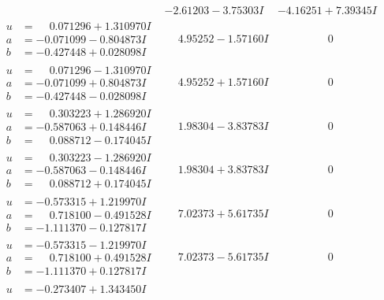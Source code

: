 \documentclass[1p]{elsarticle_modified}
\theoremstyle{definition}
\begin{document}
$$\begin{array}{c|c|c}
 & -2.61203 - 3.75303 I & -4.16251 + 7.39345 I \\ \hline\begin{aligned}
u &= \phantom{-}0.071296 + 1.310970 I \\
a &= -0.071099 - 0.804873 I \\
b &= -0.427448 + 0.028098 I\end{aligned}
 & \phantom{-}4.95252 - 1.57160 I & \phantom{-0.000000 } 0 \\ \hline\begin{aligned}
u &= \phantom{-}0.071296 - 1.310970 I \\
a &= -0.071099 + 0.804873 I \\
b &= -0.427448 - 0.028098 I\end{aligned}
 & \phantom{-}4.95252 + 1.57160 I & \phantom{-0.000000 } 0 \\ \hline\begin{aligned}
u &= \phantom{-}0.303223 + 1.286920 I \\
a &= -0.587063 + 0.148446 I \\
b &= \phantom{-}0.088712 - 0.174045 I\end{aligned}
 & \phantom{-}1.98304 - 3.83783 I & \phantom{-0.000000 } 0 \\ \hline\begin{aligned}
u &= \phantom{-}0.303223 - 1.286920 I \\
a &= -0.587063 - 0.148446 I \\
b &= \phantom{-}0.088712 + 0.174045 I\end{aligned}
 & \phantom{-}1.98304 + 3.83783 I & \phantom{-0.000000 } 0 \\ \hline\begin{aligned}
u &= -0.573315 + 1.219970 I \\
a &= \phantom{-}0.718100 - 0.491528 I \\
b &= -1.111370 - 0.127817 I\end{aligned}
 & \phantom{-}7.02373 + 5.61735 I & \phantom{-0.000000 } 0 \\ \hline\begin{aligned}
u &= -0.573315 - 1.219970 I \\
a &= \phantom{-}0.718100 + 0.491528 I \\
b &= -1.111370 + 0.127817 I\end{aligned}
 & \phantom{-}7.02373 - 5.61735 I & \phantom{-0.000000 } 0 \\ \hline\begin{aligned}
u &= -0.273407 + 1.343450 I \\

\end{aligned}
\end{array}$$
\end{document}
